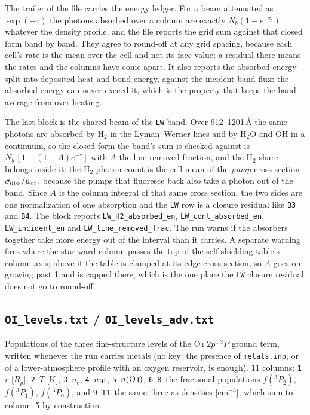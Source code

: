 \documentclass[english,a4paper]{my_memo}
\newcommand{\rp}{\ensuremath{R_p}}   %
\begin{document}
The trailer of the file carries the energy ledger. For a beam attenuated as
$\exp(-\tau)$ the photons absorbed over a column are exactly
$N_b(1-e^{-\tau_b})$ whatever the density profile, and the file reports the
grid sum against that closed form band by band. They agree to round-off at
any grid spacing, because each cell's rate is the mean over the cell and not
its face value; a residual there means the rates and the columns have come
apart. It also reports the
absorbed energy split into deposited heat and bond energy, against the incident
band flux: the absorbed energy can never exceed it, which is the property
that keeps the band average from over-heating.

The last block is the shared beam of the \texttt{LW} band. Over
912--1201\,\AA{} the same photons are absorbed by H$_2$ in the Lyman--Werner
lines and by H$_2$O and OH in a continuum, so the closed form the band's sum is
checked against is $N_b\,[1-(1-A)e^{-\tau}]$ with $A$ the line-removed fraction,
and the H$_2$ share belongs inside it: the H$_2$ photon count is the cell mean
of the \emph{pump} cross section $\sigma_{\rm diss}/p_{\rm eff}$, because the
pumps that fluoresce back also take a photon out of the band. Since $A$ is the
column integral of that same cross section, the two sides are one
normalization of one absorption and the \texttt{LW} row is a closure residual
like \texttt{B3} and \texttt{B4}. The block reports
\texttt{LW\_H2\_absorbed\_en}, \texttt{LW\_cont\_absorbed\_en},
\texttt{LW\_incident\_en} and \texttt{LW\_line\_removed\_frac}. The run warns if
the absorbers together take more energy out of the interval than it carries. A
separate warning fires where the star-ward column passes the top of the
self-shielding table's column axis; above it the table is clamped at its edge
cross section, so $A$ goes on growing past 1 and is capped there, which is the
one place the \texttt{LW} closure residual does not go to round-off.

\subsection{\texttt{OI\_levels.txt} / \texttt{OI\_levels\_adv.txt}}\label{sec:oilevels}
Populations of the three fine-structure levels of the O\,\textsc{i}
$2p^4\,^3P$ ground term, written whenever the run carries metals (no key: the
presence of \texttt{metals.inp}, or of a lower-atmosphere profile with an
oxygen reservoir, is enough). 11 columns:
\texttt{1}~$r$ [\rp], \texttt{2}~$T$ [K], \texttt{3}~$n_e$, \texttt{4}~$n_{\rm
HI}$, \texttt{5}~$n({\rm O\,\textsc{i}})$, \texttt{6--8}~the fractional
populations $f(^3P_2)$, $f(^3P_1)$, $f(^3P_0)$, and \texttt{9--11}~the same
three as densities [cm$^{-3}$], which sum to column~5 by construction.
\end{document}

